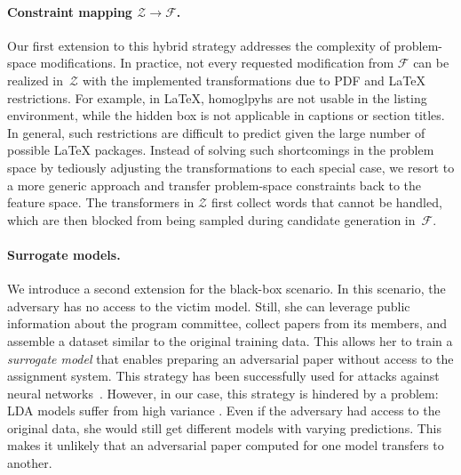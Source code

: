 \documentclass[letterpaper,twocolumn,10pt]{article}
\newcommand{\Dom}{\ensuremath{\mathcal{Z}}\xspace}
\newcommand{\F}{\ensuremath{\mathcal{F}}\xspace}
\begin{document}
\paragraph{Constraint mapping $\Dom \rightarrow \F$.}
Our first extension to this hybrid strategy addresses the complexity of problem-space modifications. In practice, not every requested modification from \F can be realized in~\Dom with the implemented transformations due to PDF and \LaTeX{} restrictions.
For example, in \LaTeX{}, homoglpyhs are not usable in the listing environment, while the hidden box is not applicable in captions or section titles. In general, such restrictions are difficult to predict given the large number of possible \LaTeX{} packages.
Instead of solving such {shortcomings\EndAccSupp{}} in the problem space by tediously adjusting the transformations to each special case, we resort to a more generic approach and transfer problem-space constraints back to the feature space. 
The transformers in \Dom first collect words that cannot be handled, which are then blocked from being sampled during candidate generation in~\F.

\paragraph{Surrogate models.}
We introduce a second extension for the black-box scenario. 
In this scenario, the adversary has no access to the victim model. Still, she can leverage public information about the program {committee\EndAccSupp{}}, collect papers from its members, and assemble a dataset similar to the original training data. This allows her to train a \emph{surrogate model} that enables preparing an adversarial paper without access to the assignment system. This strategy has been successfully used for attacks against {neural\EndAccSupp{}} networks~\cite{papernot-16-transferability}.
However, in our case, this strategy is hindered by a problem: {LDA\EndAccSupp{}} models suffer from high variance \cite{agrawal-18-what, mantyla-18-measuring}. Even if the adversary had access to the original data, she would still get different models with varying predictions. This makes it unlikely that an adversarial paper computed for one model transfers to another. 
\end{document}
